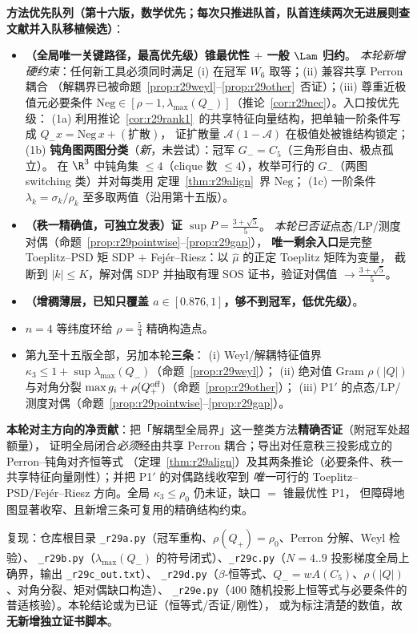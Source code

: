 \textbf{方法优先队列（第十六版，数学优先；每次只推进队首，队首连续两次无进展则查文献并入队移植候选）}：
\begin{itemize}[label={},leftmargin=1.4em,itemsep=2pt]
\item[\textbf{P1}]\textbf{（全局唯一关键路径，最高优先级）锥最优性 $+$ 一般 $\Lam$ 归约}。
\emph{本轮新增硬约束}：任何新工具必须同时满足 (i) 在冠军 $W_6$ 取等；(ii) 兼容共享 Perron 耦合
（解耦界已被命题~\ref{prop:r29weyl}--\ref{prop:r29other}~否证）；(iii) 尊重近极值元必要条件
$\mathrm{Neg}\in[\rho-1,\lambda_{\max}(Q_-)]$（推论~\ref{cor:r29nec}）。入口按优先级：
(1a) 利用推论~\ref{cor:r29rank1}~的共享特征向量结构，把单轴一阶条件写成 $Q_-x=\mathrm{Neg}\,x+(\text{扩散})$，
证扩散量 $\mathcal A(1-\mathcal A)$ 在极值处被锥结构锁定；
(1b) \textbf{钝角图两图分类}（\emph{新}，未尝试）：冠军 $G_-=C_5$（三角形自由、极点孤立）。
在 $\R^3$ 中钝角集 $\le4$（clique 数 $\le4$），枚举可行的 $G_-$（两图 switching 类）并对每类用
定理~\ref{thm:r29align}~界 $\mathrm{Neg}$；
(1c) 一阶条件 $\lambda_k=\sigma_k/\rho_k$ 至多取两值（沿用第十五版）。
\item[\textbf{P1$'$}]\textbf{（秩一精确值，可独立发表）证 $\sup P=\frac{3+\sqrt5}5$}。
\emph{本轮已否证}点态/LP/测度对偶（命题~\ref{prop:r29pointwise}--\ref{prop:r29gap}），
\textbf{唯一剩余入口}是完整 Toeplitz--PSD 矩 SDP $+$ Fejér--Riesz：以 $\widehat\mu$ 的正定 Toeplitz 矩阵为变量，
截断到 $|k|\le K$，解对偶 SDP 并抽取有理 SOS 证书，验证对偶值 $\to\frac{3+\sqrt5}5$。
\item[\textbf{P2}]\textbf{（增稠薄层，已知只覆盖 $a\in[0.876,1]$，够不到冠军，低优先级）}。
\item[\textbf{副（下界）}]$n=4$ 等纬度环给 $\rho=\frac54$ 精确构造点。
\item[\textbf{已弹出（累积，禁止再试）}]第九至十五版全部，另加本轮\textbf{三条}：
(i) Weyl/解耦特征值界 $\kappa_3\le1+\sup\lambda_{\max}(Q_-)$（命题~\ref{prop:r29weyl}）；
(ii) 绝对值 Gram $\rho(|Q|)$ 与对角分裂 $\max g_i+\rho(Q_+^{\rm off})$（命题~\ref{prop:r29other}）；
(iii) P1$'$ 的点态/LP/测度对偶（命题~\ref{prop:r29pointwise}--\ref{prop:r29gap}）。
\end{itemize}

\textbf{本轮对主方向的净贡献}：把「解耦型全局界」这一整类方法\textbf{精确否证}（附冠军处超额量），
证明全局闭合\emph{必须}经由共享 Perron 耦合；导出对任意秩三投影成立的 Perron--钝角对齐恒等式
（定理~\ref{thm:r29align}）及其两条推论（必要条件、秩一共享特征向量刚性）；并把 P1$'$ 的对偶路线收窄到
\emph{唯一}可行的 Toeplitz--PSD/Fejér--Riesz 方向。全局 $\kappa_3\le\rho_0$ 仍未证，缺口 $=$ 锥最优性 P1，
但障碍地图显著收窄、且新增三条可复用的精确结构约束。

复现：仓库根目录 \texttt{\_r29a.py}（冠军重构、$\rho(Q_+)=\rho_0$、Perron 分解、Weyl 检验）、
\texttt{\_r29b.py}（$\lambda_{\max}(Q_-)$ 的符号闭式）、\texttt{\_r29c.py}（$N=4..9$ 投影梯度全局上确界，输出 \texttt{\_r29c\_out.txt}）、
\texttt{\_r29d.py}（$\beta$-恒等式、$Q_-=wA(C_5)$、$\rho(|Q|)$、对角分裂、矩对偶缺口构造）、
\texttt{\_r29e.py}（$400$ 随机投影上恒等式与必要条件的普适核验）。本轮结论或为已证（恒等式/否证/刚性），
或为标注清楚的数值，故\textbf{无新增独立证书脚本}。